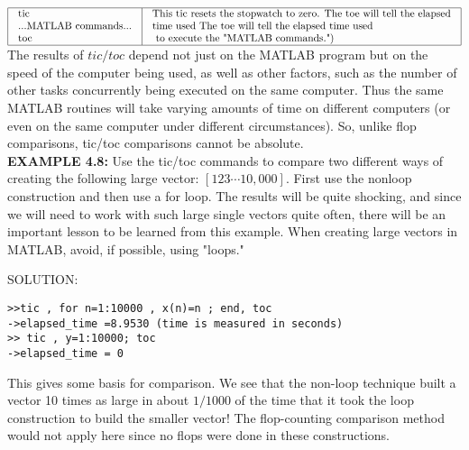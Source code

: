 \documentclass[../main.tex]{subfiles}
\begin{document}
$
\begin{array}{|l|l|}
\hline \begin{array}{l}
\text {tic }\\
\text {...MATLAB commands...}\\
\text {toc }\\
\end{array} & \begin{array}{l}
\text {This tic resets the stopwatch to zero. The toe will tell the elapsed} \\
\text {time used The toe will tell the elapsed time used }\\
\text { to execute the "MATLAB commands.")} \\
\end{array} \\
\hline
\end{array}
$ \\

The results of $tic / toc$ depend not just on the MATLAB program but on the speed of the computer being used, as well as other factors, such as the number of other tasks concurrently being executed on the same computer. Thus the same MATLAB routines will take varying amounts of time on different computers (or even on the same computer under different circumstances). So, unlike flop comparisons, tic/toc comparisons cannot be absolute.\\

\textbf{EXAMPLE 4.8:} Use the tic/toc commands to compare two different ways of creating the following large vector: $[1 2 3  \cdots  10,000]$. First use the nonloop construction and then use a for loop. The results will be quite shocking, and since we will need to work with such large single vectors quite often, there will be an important lesson to be learned from this example. When creating large vectors in MATLAB, avoid, if possible, using "loops."

SOLUTION:

\begin{verbatim}
>>tic , for n=1:10000 , x(n)=n ; end, toc
->elapsed_time =8.9530 (time is measured in seconds)
>> tic , y=1:10000; toc
->elapsed_time = 0 
\end{verbatim}


This gives some basis for comparison. We see that the non-loop technique built a vector 10 times as large in about $1 / 1000$ of the time that it took the loop construction to build the smaller vector! The flop-counting comparison method would not apply here since no flops were done in these constructions.\\
 
\end{document}
